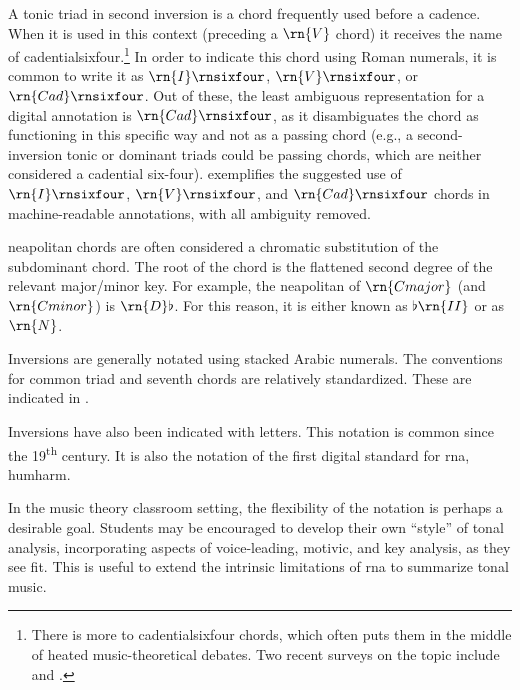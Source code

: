 A tonic triad in second inversion is a chord frequently used
before a cadence. When it is used in this context (preceding
a $\rn{V}$ chord) it receives the name of
\gls{cadentialsixfour}.\footnote{There is more to
\gls{cadentialsixfour} chords, which often puts them in
the middle of heated music-theoretical debates. Two recent
surveys on the topic include \textcite{mirka2015mystery} and
\textcite{ninov2016functional}.} In order to indicate this
chord using Roman numerals, it is common to write it as
$\rn{I}\rnsixfour$, $\rn{V}\rnsixfour$, or
$\rn{Cad}\rnsixfour$. Out of these, the least ambiguous
representation for a digital annotation is
$\rn{Cad}\rnsixfour$, as it disambiguates the chord as
functioning in this specific way and not as a passing chord
(e.g., a second-inversion tonic or dominant triads could be
passing chords, which are neither considered a cadential
six-four).  exemplifies the
suggested use of $\rn{I}\rnsixfour$, $\rn{V}\rnsixfour$, and
$\rn{Cad}\rnsixfour$ chords in machine-readable annotations,
with all ambiguity removed.


\gls{neapolitan} chords are often considered a chromatic
substitution of the subdominant chord. The root of the chord
is the flattened second degree of the relevant major/minor
key. For example, the \gls{neapolitan} of $\rn{C major}$
(and $\rn{C minor}$) is $\rn{D}\flat$. For this reason, it
is either known as $\flat\rn{II}$ or as $\rn{N}$.

Inversions are generally notated using stacked Arabic
numerals. The conventions for common triad and seventh
chords are relatively standardized. These are indicated in
.


Inversions have also been indicated with letters. This
notation is common since the 19\textsuperscript{th} century.
It is also the notation of the first digital standard for
\gls{rna}, \gls{humharm}.

In the music theory classroom setting, the flexibility of
the notation is perhaps a desirable goal. Students may be
encouraged to develop their own ``style'' of tonal analysis,
incorporating aspects of voice-leading, motivic, and key
analysis, as they see fit. This is useful to extend the
intrinsic limitations of \gls{rna} to summarize tonal music.


